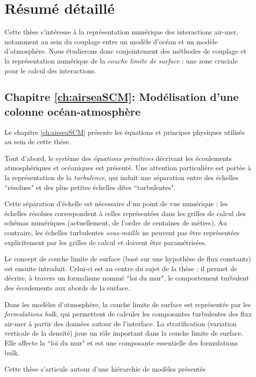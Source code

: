 \chapter*{Résumé détaillé}
Cette thèse s'intéresse à la représentation
numérique des interactions air-mer, notamment au sein
du couplage entre un modèle d'océan et un modèle d'atmosphère.
Nous étudierons donc conjointement des méthodes de couplage
et la représentation numérique de la
\textit{couche limite de surface} :
une zone cruciale pour le calcul des interactions.
%
\section*{Chapitre \ref{ch:airseaSCM}: Modélisation d'une colonne
océan-atmosphère}
Le chapitre \ref{ch:airseaSCM} présente les équations et
principes physiques utilisés
au sein de cette thèse.
\par
Tout d'abord, le système des \textit{équations primitives}
décrivant les écoulements atmosphériques et océaniques est présenté.
Une attention particulière est portée à la représentation de la
\textit{turbulence}, qui induit une séparation entre des échelles
``résolues" et des plus petites échelles dites ``turbulentes".
\par
Cette séparation d'échelle est nécessaire d'un point de vue
numérique : les échelles résolues correspondent à celles représentées
dans les grilles de calcul des schémas numériques (actuellement,
de l'ordre de centaines de mètres). Au contraire, les échelles
turbulentes \textit{sous-maille} ne peuvent pas être représentées
explicitement par les grilles de calcul et doivent être paramétrisées.
\par
Le concept de couche limite de surface
(basé sur une hypothèse de flux constants) est ensuite introduit.
Celui-ci est au centre du sujet de la thèse : il permet de décrire,
à travers un formalisme nommé ``loi du mur",
le comportement turbulent des écoulements aux abords de la surface.
\par
Dans les modèles d'atmosphère, la couche limite de surface est
représentée par les \textit{formulations bulk},
qui permettent de calculer les composantes
turbulentes des flux air-mer à partir des données autour de
l'interface.
La stratification (variation verticale de la densité) joue un rôle
important dans la couche limite de surface. Elle affecte la
``loi du mur" et est une composante essentielle des formulations
bulk.
\par
Cette thèse s'articule autour d'une hiérarchie de modèles présentés
